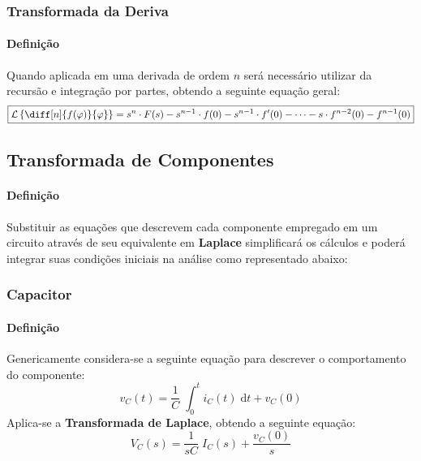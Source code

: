 \documentclass{article}
\begin{document}
            \subsubsection{Transformada da Deriva}
                \paragraph{Definição}Quando aplicada em uma derivada de ordem $n$ será necessário utilizar da recursão e integração por partes, obtendo a seguinte equação geral:
                    \begin{equation}
                        \boxed{
                            \mathcal{L}\left\{\diff[n]{f(\varphi)}{\varphi}\right\} = 
                            s^{n}\cdot F(s) - 
                            s^{n-1} \cdot f(0) - 
                            s^{n-1} \cdot f'(0) - \dots - 
                            s \cdot f^{n-2}(0) - 
                            f^{n-1}(0)
                        }
                    \end{equation}

        \subsection{Transformada de Componentes}
            \paragraph{Definição}Substituir as equações que descrevem cada componente empregado em um circuito através de seu equivalente em \textbf{Laplace} simplificará os cálculos e poderá integrar suas condições iniciais na análise como representado abaixo:

            \subsubsection{Capacitor}
                \paragraph{Definição}Genericamente considera-se a seguinte equação para descrever o comportamento do componente:
                    \begin{equation*}
                        v_{C}(t) = \frac{1}{C}\;\int_{0}^{t} i_{C}(t)\;\text{d}t + v_{C}(0)
                    \end{equation*}
                Aplica-se a \textbf{Transformada de Laplace}, obtendo a seguinte equação:
                    \begin{equation}
                        \boxed{
                            V_{C}(s) = \frac{1}{sC}\;I_{C}(s) + \frac{v_{C}(0)}{s}
                        }
                    \end{equation}
\end{document}
